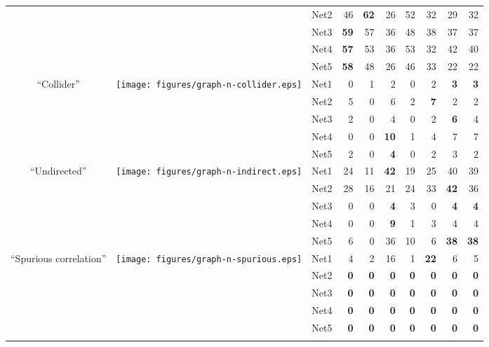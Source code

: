 \begin{table*}[t]
\begin{adjustbox}{max width=\textwidth}
\begin{tabular}{cccrrrrrrr}
  &   & Net2 & 46 & \textbf{62} & 26 & 52 & 32 & 29 & 32 \\
  &   & Net3 & \textbf{59} & 57 & 36 & 48 & 38 & 37 & 37 \\
  &   & Net4 & \textbf{57} & 53 & 36 & 53 & 32 & 42 & 40 \\
  &   & Net5 & \textbf{58} & 48 & 26 & 46 & 33 & 22 & 22 \\
\midrule
\multirow{5}{*}{``Collider''} & \multirow{5}{*}{\texttt{[image: figures/graph-n-collider.eps]}} & Net1 & 0 & 1 & 2 & 0 & 2 & \textbf{3} & \textbf{3} \\
  &   & Net2 & 5 & 0 & 6 & 2 & \textbf{7} & 2 & 2 \\
  &   & Net3 & 2 & 0 & 4 & 0 & 2 & \textbf{6} & 4 \\
  &   & Net4 & 0 & 0 & \textbf{10} & 1 & 4 & 7 & 7 \\
  &   & Net5 & 2 & 0 & \textbf{4} & 0 & 2 & 3 & 2 \\
\midrule
\multirow{5}{*}{``Undirected''} & \multirow{5}{*}{\texttt{[image: figures/graph-n-indirect.eps]}} & Net1 & 24 & 11 & \textbf{42} & 19 & 25 & 40 & 39 \\
  &   & Net2 & 28 & 16 & 21 & 24 & 33 & \textbf{42} & 36 \\
  &   & Net3 & 0 & 0 & \textbf{4} & 3 & 0 & \textbf{4} & \textbf{4} \\
  &   & Net4 & 0 & 0 & \textbf{9} & 1 & 3 & 4 & 4 \\
  &   & Net5 & 6 & 0 & 36 & 10 & 6 & \textbf{38} & \textbf{38} \\
\midrule
\multirow{5}{*}{``Spurious correlation''} & \multirow{5}{*}{\texttt{[image: figures/graph-n-spurious.eps]}} & Net1 & 4 & 2 & 16 & 1 & \textbf{22} & 6 & 5 \\
  &   & Net2 & \textbf{0} & \textbf{0} & \textbf{0} & \textbf{0} & \textbf{0} & \textbf{0} & \textbf{0} \\
  &   & Net3 & \textbf{0} & \textbf{0} & \textbf{0} & \textbf{0} & \textbf{0} & \textbf{0} & \textbf{0} \\
  &   & Net4 & \textbf{0} & \textbf{0} & \textbf{0} & \textbf{0} & \textbf{0} & \textbf{0} & \textbf{0} \\
  &   & Net5 & \textbf{0} & \textbf{0} & \textbf{0} & \textbf{0} & \textbf{0} & \textbf{0} & \textbf{0} \\
\midrule
\botrule
\end{tabular}\end{adjustbox}{}
\end{table*}
